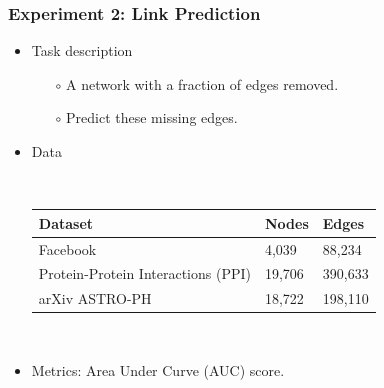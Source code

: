 \documentclass[notes, 10pt, aspectratio=169]{beamer}
\begin{document}
\begin{frame}
    \frametitle{Experiment 2: Link Prediction}
    \begin{itemize}
        \item Task description
            \begin{itemize}
                \item[$\circ$] A network with a fraction of edges removed.
                \item[$\circ$] Predict these missing edges.
            \end{itemize}
        \item Data\par
            ~\\
            \begin{tabular}{lll}
                \toprule
                \textbf{Dataset} & \textbf{Nodes} & \textbf{Edges}\\
                \midrule
                Facebook & 4,039 & 88,234 \\
                Protein-Protein Interactions (PPI) & 19,706 & 390,633\\
                arXiv ASTRO-PH & 18,722 & 198,110\\
                \bottomrule
            \end{tabular}
            \par~\\
        \item Metrics: Area Under Curve (AUC) score.
    \end{itemize}
\end{frame}
\end{document}
